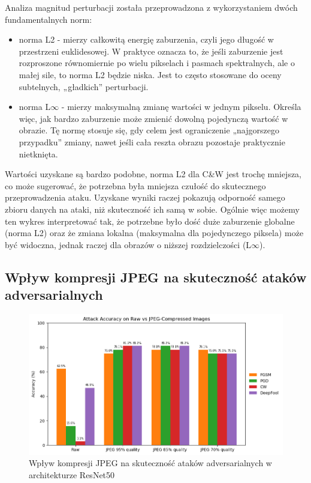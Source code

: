 \documentclass[12pt]{article}
\begin{document}
Analiza magnitud perturbacji została przeprowadzona z wykorzystaniem dwóch fundamentalnych norm:
\begin{itemize}
    \item norma L2 - mierzy całkowitą energię zaburzenia, czyli jego długość w przestrzeni euklidesowej. W praktyce oznacza to, że jeśli zaburzenie jest rozproszone równomiernie po wielu pikselach i pasmach spektralnych, ale o małej sile, to norma L2 będzie niska. Jest to często stosowane do oceny subtelnych, „gładkich” perturbacji.
    \item norma L$\infty$ - mierzy maksymalną zmianę wartości w jednym pikselu. Określa więc, jak bardzo zaburzenie może zmienić dowolną pojedynczą wartość w obrazie. Tę normę stosuje się, gdy celem jest ograniczenie „najgorszego przypadku” zmiany, nawet jeśli cała reszta obrazu pozostaje praktycznie nietknięta.
\end{itemize}
Wartości uzyskane są bardzo podobne, norma L2 dla C\&W jest trochę mniejsza, co może sugerować, że potrzebna była mniejsza czułość do skutecznego przeprowadzenia ataku. Uzyskane wyniki raczej pokazują odporność samego zbioru danych na ataki, niż skuteczność ich samą w sobie. Ogólnie więc możemy ten wykres interpretować tak, że potrzebne było dość duże zaburzenie globalne (norma L2) oraz że zmiana lokalna (maksymalna dla pojedynczego piksela) może być widoczna, jednak raczej dla obrazów o niższej rozdzielczości (L$\infty$).

\subsection{Wpływ kompresji JPEG na skuteczność ataków adversarialnych}

\begin{figure}[H]
    \centering
    \includegraphics[width=1\textwidth]{jpeg_accuracy.png}
    \caption{Wpływ kompresji JPEG na skuteczność ataków adversarialnych w architekturze ResNet50}
    \label{fig:jpeg-compression}
\end{figure}
\end{document}
